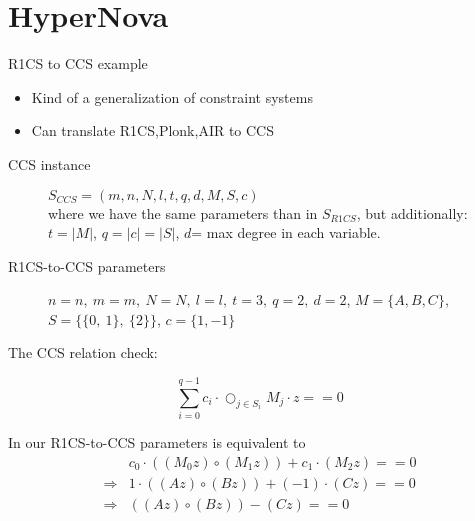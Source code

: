 \documentclass{beamer}
\begin{document}
\section[HyperNova]{HyperNova}


\begin{frame}{R1CS to CCS example}

\begin{scriptsize}
\begin{itemize}
  \item Kind of a generalization of constraint systems
  \item Can translate R1CS,Plonk,AIR to CCS
\end{itemize}
\pause
\begin{description}
	\item[CCS instance] $S_{CCS} = (m, n, N, l, t, q, d, M, S, c)$\\
		where we have the same parameters than in $S_{R1CS}$, but additionally:\\
		$t=|M|$, $q = |c| = |S|$, $d$= max degree in each variable.
	\item[R1CS-to-CCS parameters] $n=n,~ m=m,~ N=N,~ l=l,~ t=3,~ q=2,~ d=2$, $M=\{A,B,C\}$, $S=\{\{0,~1\},~ \{2\}\}$, $c=\{1,-1\}$
\end{description}
\pause

The CCS relation check:
\end{scriptsize}

$$\sum_{i=0}^{q-1} c_i \cdot \bigcirc_{j \in S_i} M_j \cdot z ==0$$

\begin{scriptsize}
In our R1CS-to-CCS parameters is equivalent to
\begin{align*}
	&c_0 \cdot ( (M_0 z) \circ (M_1 z) ) + c_1 \cdot (M_2 z) ==0\\
	\Longrightarrow &1 \cdot ( (A z) \circ (B z) ) + (-1) \cdot (C z) ==0\\
	\Longrightarrow &( (A z) \circ (B z) ) - (C z) ==0
\end{align*}
\end{scriptsize}

\end{frame}
\end{document}
